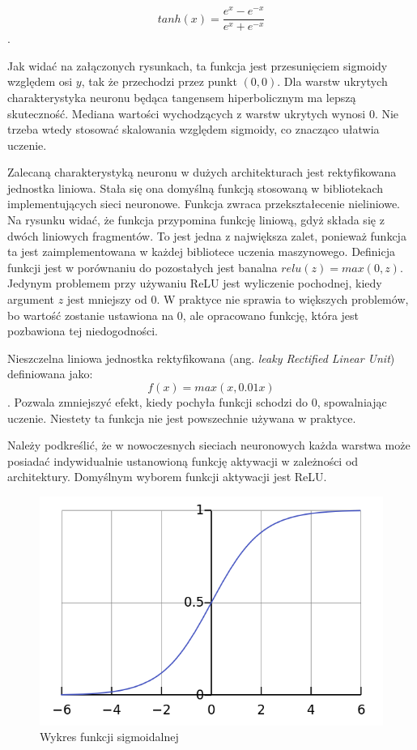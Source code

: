 \documentclass[12pt,a4paper,twoside,titlepage,openright]{book}
\begin{document}
\begin{itemize}
$$tanh(x) = \frac{e^{x} - e^{-x}}{e^{x} + e^{-x}}$$. 

Jak widać na załączonych rysunkach, ta funkcja jest przesunięciem sigmoidy względem osi \(y\), tak że przechodzi przez punkt \((0,0)\). Dla warstw ukrytych charakterystyka neuronu będąca tangensem hiperbolicznym ma lepszą skuteczność. Mediana wartości wychodzących z warstw ukrytych wynosi 0. Nie trzeba wtedy stosować skalowania względem sigmoidy, co znacząco ułatwia uczenie.

Zalecaną charakterystyką neuronu w dużych architekturach jest rektyfikowana jednostka liniowa. Stała się ona domyślną funkcją stosowaną w bibliotekach implementujących sieci neuronowe. Funkcja zwraca przekształecenie nieliniowe. Na rysunku widać, że funkcja przypomina funkcję liniową, gdyż składa się z dwóch liniowych fragmentów. To jest jedna z największa zalet, ponieważ funkcja ta jest zaimplementowana w każdej bibliotece uczenia maszynowego. Definicja funkcji jest w porównaniu do pozostałych jest banalna \(relu(z) = max(0,z)\). Jedynym problemem przy używaniu ReLU jest wyliczenie pochodnej, kiedy argument \(z\) jest mniejszy od 0. W praktyce nie sprawia to większych problemów, bo wartość zostanie ustawiona na 0, ale opracowano funkcję, która jest pozbawiona tej niedogodności.

Nieszczelna liniowa jednostka rektyfikowana (ang. \textit{leaky Rectified Linear Unit}) definiowana jako: $$f(x) = max(x, 0.01x)$$. Pozwala zmniejszyć efekt, kiedy pochyła funkcji schodzi do 0, spowalniając uczenie. Niestety ta funkcja nie jest powszechnie używana w praktyce.

Należy podkreślić, że w nowoczesnych sieciach neuronowych każda warstwa może posiadać indywidualnie ustanowioną funkcję aktywacji w zależności od architektury. Domyślnym wyborem funkcji aktywacji jest ReLU. 

\begin{figure}[ht]
	\centering
			\includegraphics[resolution=100, scale=0.7]{Sigmoid.png}
		\caption{Wykres funkcji sigmoidalnej}
\end{figure}


\end{itemize}
\end{document}
